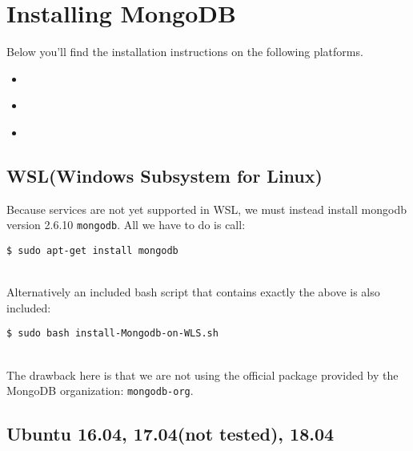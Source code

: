 \section{Installing MongoDB}\label{installing-mongodb}

Below you'll find the installation instructions on the following platforms.

\begin{itemize}
\item
 ~
\item
 ~
\item
  ~
\end{itemize}

\leavevmode
\newline
\subsection{WSL(Windows Subsystem for Linux)}\label{sec:wsl}

Because services are not yet supported in WSL, we must instead install mongodb version 2.6.10 \texttt{mongodb}. All we have to do is call:
\begin{lstlisting}[backgroundcolor = \color{light-gray}]
$ sudo apt-get install mongodb
\end{lstlisting}
~\\
Alternatively an included bash script that contains exactly the above is also included:
\begin{lstlisting}[backgroundcolor = \color{light-gray}]
$ sudo bash install-Mongodb-on-WLS.sh
\end{lstlisting}
~\\
The drawback here is that we are not using the official package provided by the MongoDB organization: \texttt{mongodb-org}.

\leavevmode
\newline
\subsection{Ubuntu 16.04, 17.04(not tested), 18.04}\label{sec:16.04}

